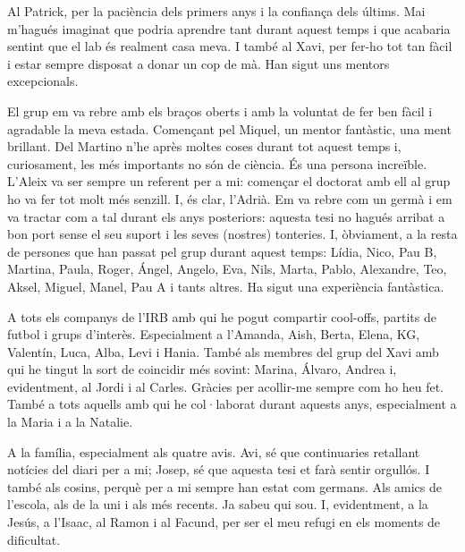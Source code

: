 

Al Patrick, per la paciència dels primers anys i la confiança dels últims. Mai m’hagués imaginat que podria aprendre tant durant aquest temps i que acabaria sentint que el lab és realment casa meva. I també al Xavi, per fer-ho tot tan fàcil i estar sempre disposat a donar un cop de mà. Han sigut uns mentors excepcionals.

El grup em va rebre amb els braços oberts i amb la voluntat de fer ben fàcil i agradable la meva estada. Començant pel Miquel, un mentor fantàstic, una ment brillant. Del Martino n’he après moltes coses durant tot aquest temps i, curiosament, les més importants no són de ciència. És una persona increïble. L’Aleix va ser sempre un referent per a mi: començar el doctorat amb ell al grup ho va fer tot molt més senzill. I, és clar, l’Adrià. Em va rebre com un germà i em va tractar com a tal durant els anys posteriors: aquesta tesi no hagués arribat a bon port sense el seu suport i les seves (nostres) tonteries. I, òbviament, a la resta de persones que han passat pel grup durant aquest temps: Lídia, Nico, Pau B, Martina, Paula, Roger, Ángel, Angelo, Eva, Nils, Marta, Pablo, Alexandre, Teo, Aksel, Miguel, Manel, Pau A i tants altres. Ha sigut una experiència fantàstica. 

A tots els companys de l’IRB amb qui he pogut compartir cool-offs, partits de futbol i grups d’interès. Especialment a l’Amanda, Aish, Berta, Elena, KG, Valentín, Luca, Alba, Levi i Hania. També als membres del grup del Xavi amb qui he tingut la sort de coincidir més sovint: Marina, Álvaro, Andrea i, evidentment, al Jordi i al Carles. Gràcies per acollir-me sempre com ho heu fet. També a tots aquells amb qui he col·laborat durant aquests anys, especialment a la Maria i a la Natalie. 

A la família, especialment als quatre avis. Avi, sé que continuaries retallant notícies del diari per a mi; Josep, sé que aquesta tesi et farà sentir orgullós. I també als cosins, perquè per a mi sempre han estat com germans. Als amics de l’escola, als de la uni i als més recents. Ja sabeu qui sou. I, evidentment, a la Jesús, a l’Isaac, al Ramon i al Facund, per ser el meu refugi en els moments de dificultat.

